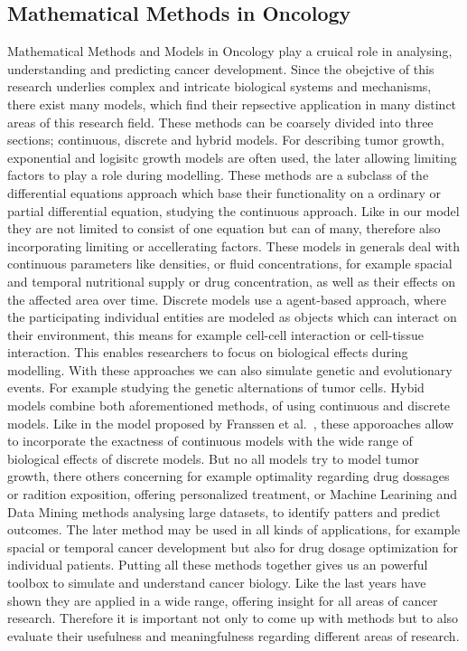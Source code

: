 \subsection{Mathematical Methods in Oncology}
Mathematical Methods and Models in Oncology play a cruical role in analysing, understanding and predicting cancer development. Since the obejctive of this research underlies complex and intricate biological systems and mechanisms, there exist many models, which find their repsective application in many distinct areas of this research field. These methods can be coarsely divided into three sections; continuous, discrete and hybrid models. For describing tumor growth, exponential and logisitc growth models are often used, the later allowing limiting factors to play a role during modelling. These methods are a subclass of the differential equations approach which base their functionality on a ordinary or partial differential equation, studying the continuous approach. Like in our model they are not limited to consist of one equation but can of many, therefore also incorporating limiting or accellerating factors. These models in generals deal with continuous parameters like densities, or fluid concentrations, for example spacial and temporal nutritional supply or drug concentration, as well as their effects on the affected area over time. Discrete models use a agent-based approach, where the participating individual entities are modeled as objects which can interact on their environment, this means for example cell-cell interaction or cell-tissue interaction. This enables researchers to focus on biological effects during modelling. With these approaches we can also simulate genetic and evolutionary events. For example studying the genetic alternations of tumor cells.\newline 
Hybid models combine both aforementioned methods, of using continuous and discrete models. Like in the model proposed by Franssen et al.~\cite{franssen_mathematical_2019}, these apporoaches allow to incorporate the exactness of continuous models with the wide range of biological effects of discrete models. \newline
But no all models try to model tumor growth, there others concerning for example optimality regarding drug dossages or radition exposition, offering personalized treatment, or Machine Learining and Data Mining methods analysing large datasets, to identify patters and predict outcomes. The later method may be used in all kinds of applications, for example spacial or temporal cancer development but also for drug dosage optimization for individual patients. Putting all these methods together gives us an powerful toolbox to simulate and understand cancer biology. Like the last years have shown they are applied in a wide range, offering insight for all areas of cancer research. Therefore it is important not only to come up with methods but to also evaluate their usefulness and meaningfulness regarding different areas of research.